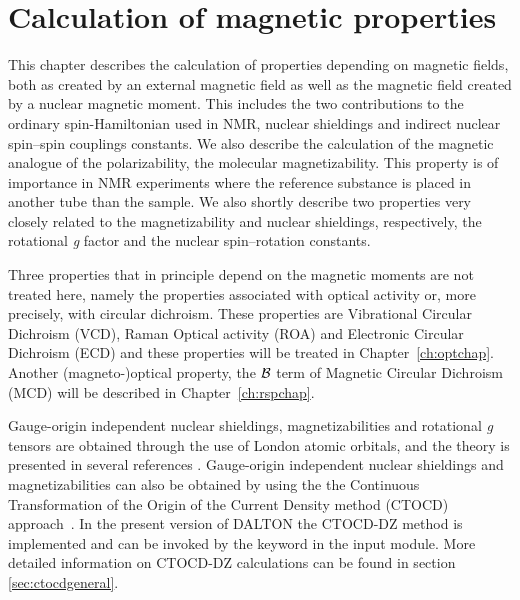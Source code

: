\chapter{Calculation of magnetic properties}\label{ch:magnetic}

This chapter describes the calculation of properties depending on
magnetic fields, both as created by an external magnetic field as well
as the magnetic field created by a nuclear magnetic moment.
This includes the two
contributions to the ordinary spin-Hamiltonian used in NMR, nuclear
shieldings and indirect nuclear spin--spin
couplings constants. We
also describe the calculation of the magnetic analogue of the
polarizability, the molecular
magnetizability. This property
is of importance in NMR experiments where the reference substance is placed
in another tube than the sample. We also shortly
describe two properties very closely related to the magnetizability
and nuclear shieldings, respectively, the rotational {\em g} factor and the
nuclear spin--rotation constants.

Three properties that in principle depend on the %
magnetic moments are
not treated here, namely the properties associated with optical
activity or, more precisely, with circular dichroism. These
properties are Vibrational Circular Dichroism
(VCD), Raman
Optical activity (ROA) and
Electronic Circular Dichroism (ECD) and these properties will be treated in
Chapter~\ref{ch:optchap}. 
Another (magneto-)optical property, the ${\cal{B}}$ term of
Magnetic Circular Dichroism (MCD) will be described in
Chapter~\ref{ch:rspchap}.

Gauge-origin independent nuclear shieldings,
magnetizabilities and rotational {\em g} tensors are
obtained through the use of London atomic orbitals, and the theory is
presented in several references
\cite{kwjfhppjacs112,krthrkpjklbhjajjcp100,krthklbpjhjajjcp99,krthklbpjjocp195}.
Gauge-origin independent nuclear shieldings and
magnetizabilities can also be obtained by using the 
the Continuous Transformation of the Origin of the Current Density method (CTOCD)
 approach~\cite{paololazz1,paololazz2,ctocd}. In the present
version of DALTON the CTOCD-DZ method is implemented and can be invoked by
the keyword  in the  input module.
More detailed information on CTOCD-DZ calculations can be found in section
\ref{sec:ctocdgeneral}. 


